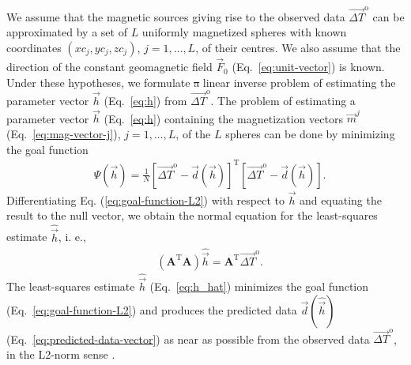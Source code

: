 \documentclass[journal abbreviation, npg]{copernicus}
\providecommand{\DIFadd}[1]{{\protect\color{blue}\uwave{#1}}} %
\providecommand{\DIFdel}[1]{{\protect\color{red}\sout{#1}}}                      %
\providecommand{\DIFaddbegin}{} %
\providecommand{\DIFaddend}{} %
\providecommand{\DIFdelbegin}{} %
\providecommand{\DIFdelend}{} %
\begin{document}
We assume that the magnetic sources giving rise to the observed data
$\vec{\Delta T}^\mathrm{o}$ can be approximated by a set of $L$ uniformly
magnetized spheres with known coordinates $(xc_{j}, yc_{j}, zc_{j})$, $j = 1,
\ldots, L$, of their centres. We also assume that the direction of the
constant geomagnetic field $\vec{F}_{0}$ (Eq.~\ref{eq:unit-vector}) is known.
Under these hypotheses, we formulate \DIFdelbegin \DIFdel{a }\DIFdelend \DIFaddbegin \DIFadd{an overdetermined }\DIFaddend linear inverse problem 
of estimating
the parameter vector $\vec{h}$ (Eq.~\ref{eq:h}) from $\vec{\Delta
T}^\mathrm{o}$. The problem of estimating a parameter vector $\vec{h}$
(Eq.~\ref{eq:h}) containing the magnetization vectors $\vec{m}^{j}$
(Eq.~\ref{eq:mag-vector-j}), $j = 1, \ldots, L$, of the $L$ spheres can be
done by minimizing the goal function
\begin{align}
 &
\Psi(\vec{h}) = \frac{1}{N}[\vec{\Delta T}^\mathrm{o} - \vec{d}(\vec{h})]^{\mathrm{T}}[\vec{\Delta T}^\mathrm{o} - \vec{d}(\vec{h})] .
\label{eq:goal-function-L2}
\end{align}
Differentiating Eq. (\ref{eq:goal-function-L2}) with respect to
$\vec{h}$ and equating the result to the null vector, we obtain the
normal equation for the least-squares estimate $\hat{\vec{h}}$, i. e.,
\begin{align}
 &
(\mathbf{A}^{\mathrm{T}}\mathbf{A})  \hat{\vec{h}} = \mathbf{A}^{\mathrm{T}}  \vec{\Delta T}^\mathrm{o} .
\label{eq:h_hat}
\end{align}
The least-squares estimate $\hat{\vec{h}}$ (Eq.~\ref{eq:h_hat}) minimizes the
goal function (Eq.~\ref{eq:goal-function-L2}) and produces the predicted data
$\vec{d}(\hat{\vec{h}})$ (Eq.~\ref{eq:predicted-data-vector}) as near as
possible from the observed data $\vec{\Delta T}^\mathrm{o}$, in the L2-norm
sense \citep{bard1973,twomey1977,menke1989,aster-etal2005}.
\end{document}
